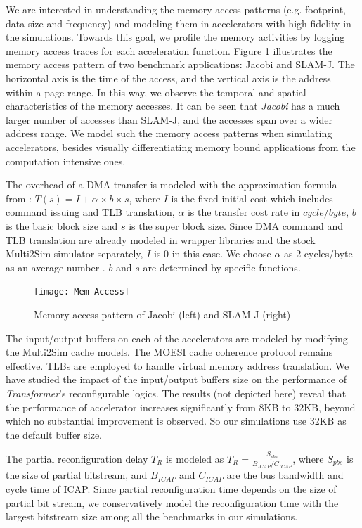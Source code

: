 We are interested in understanding the memory access
patterns (e.g. footprint, data size and frequency) and modeling
them in accelerators with high fidelity in the simulations. Towards this goal, we profile the memory
activities by logging memory access traces for each 
acceleration function.
Figure \ref{fig_mem_access} illustrates the memory access pattern of
two benchmark applications: Jacobi and SLAM-J. The horizontal axis is
the time of the access, and the vertical axis is the address within a
page range. In this way, we observe the temporal and spatial
characteristics of the memory accesses. It can be seen that {\em
  Jacobi} has a much larger number of  accesses than SLAM-J, and the
accesses span over a wider address range. We model such the memory
access patterns when simulating accelerators, besides visually
differentiating memory bound applications from the computation intensive
ones. 

The overhead of a DMA transfer is modeled with the approximation
formula from \cite{Saidi:2012}: $ T(s) = I + \alpha \times b \times
s$, where $I$ is the fixed initial cost which includes command issuing
and TLB translation, $\alpha$ is the transfer cost rate in
$cycle/byte$, $b$ is the basic block size and $s$ is the super block
size. Since DMA command and TLB translation are already modeled in wrapper libraries and the
stock Multi2Sim simulator separately, $I$ is 0 in this case. We choose $\alpha$
as 2 cycles/byte as an average number \cite{Saidi:2012}. $b$ and $s$
are determined by specific functions.


\begin{figure}
    \centering
    \texttt{[image: Mem-Access]}
	\caption{Memory access pattern of Jacobi (left) and SLAM-J (right)}
\label{fig_mem_access}
\end{figure}


The input/output buffers on each of the accelerators are modeled by
modifying the Multi2Sim cache models. The MOESI cache coherence
protocol remains effective. TLBs are employed to handle virtual memory
address translation.  We have studied the impact of the input/output
buffers size on the performance of {\em Transformer}'s reconfigurable
logics. The results (not depicted here) reveal that the performance of
accelerator increases significantly from 8KB to 32KB, beyond which no
substantial improvement is observed. So our simulations use 32KB as
the default buffer size.

The partial reconfiguration delay $T_R$ is modeled as $ T_R = \frac{S_{pbs}}{ B_{ICAP} / C_{ICAP}} $,
where $S_{pbs}$ is the size of
partial bitstream, and $B_{ICAP}$ and $C_{ICAP}$ are the bus bandwidth
and cycle time of ICAP.
Since partial reconfiguration time depends on the size of partial bit
stream, we conservatively model the reconfiguration time with the
largest bitstream size among all the benchmarks in our simulations. 


